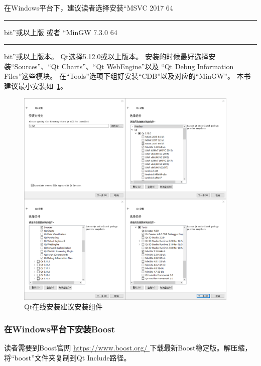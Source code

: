 在Windows平台下，建议读者选择安装“MSVC 2017 64\hspace{0.05em}\rule[0.7ex]{0.4em}{0.65pt}\hspace{0.05em}bit”或以上版
或者
“MinGW 7.3.0 64\hspace{0.05em}\rule[0.7ex]{0.4em}{0.65pt}\hspace{0.05em}bit”或以上版本。
Qt选择5.12.0或以上版本。
安装的时候最好选择安装“Sources”、“Qt Charts”、“Qt WebEngine”以及
“Qt Debug Information Files”这些模块。
在“Tools”选项下组好安装“CDB”以及对应的“MinGW”。
本书建议最小安装如\figurename\ \ref{p000001}。
\begin{figure}[htb] %
\marginnote{\setlength\fboxsep{2pt}\fbox{\footnotesize{\kaishu\figurename\,}\footnotesize{\ref{p000001}}}}\centering %
\includegraphics[width=0.95\textwidth]{chapter01/images/windows_qt_online_install.png} %
\caption{Qt在线安装建议安装组件} %
\label{p000001} %
\end{figure}


\FloatBarrier
\subsubsection{
在Windows平台下安装Boost
}\label{ss000210}

读者需要到Boost官网 \url{https://www.boost.org/
}下载最新Boost稳定版。解压缩，将“boost”文件夹复制到Qt Include路径。


